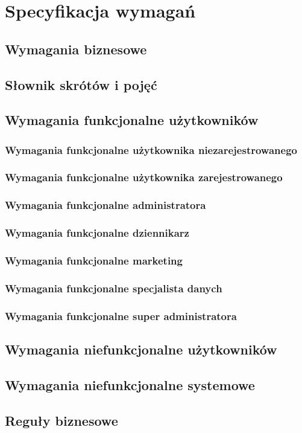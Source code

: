 \chapter{Specyfikacja wymagań}
\section{Wymagania biznesowe}
\section{Słownik skrótów i pojęć}
\cite{java_fundamentals}
\section{Wymagania funkcjonalne użytkowników}
\subsection{Wymagania funkcjonalne użytkownika niezarejestrowanego}
\subsection{Wymagania funkcjonalne użytkownika zarejestrowanego}
\subsection{Wymagania funkcjonalne administratora}
\subsection{Wymagania funkcjonalne dziennikarz}
\subsection{Wymagania funkcjonalne marketing}
\subsection{Wymagania funkcjonalne specjalista danych}
\subsection{Wymagania funkcjonalne super administratora}
\section{Wymagania niefunkcjonalne użytkowników}
\section{Wymagania niefunkcjonalne systemowe}
\section{Reguły biznesowe}
\cite{java17doc}

